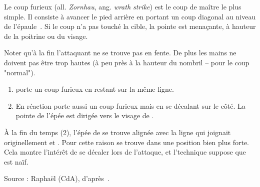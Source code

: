 
\begin{coup}

Le coup furieux (all. \emph{Zornhau}, ang. \emph{wrath strike}) est le coup de maître le plus simple.
Il consiste à avancer le pied arrière en portant un coup diagonal au niveau de l'épaule~\cite[fol.~19r-20v, p.~16]{farrell:ringeck}.
Si le coup n'a pas touché la cible, la pointe est menaçante, à hauteur de la poitrine ou du visage.

\end{coup}


Noter qu'à la fin l'attaquant ne se trouve pas en fente.
De plus les mains ne doivent pas être trop hautes (à peu près à la hauteur du nombril – pour le coup "normal").


\begin{technique}

\begin{enumerate}
	\item \A porte un coup furieux en restant sur la même ligne.
	
	\item En réaction \D porte aussi un coup furieux mais en se décalant sur le côté.
	La pointe de l'épée est dirigée vers le visage de \A.
\end{enumerate}

À la fin du temps (2), l'épée de \D se trouve alignée avec la ligne qui joignait originellement \A et \D.
Pour cette raison \D se trouve dans une position bien plus forte.
Cela montre l'intérêt de se décaler lors de l'attaque, et l'technique suppose que \A est naïf.

Source : Raphaël (CdA), d'après~\cite[fol.~19r-20v, §1, p.~16]{farrell:ringeck}.
\end{technique}


